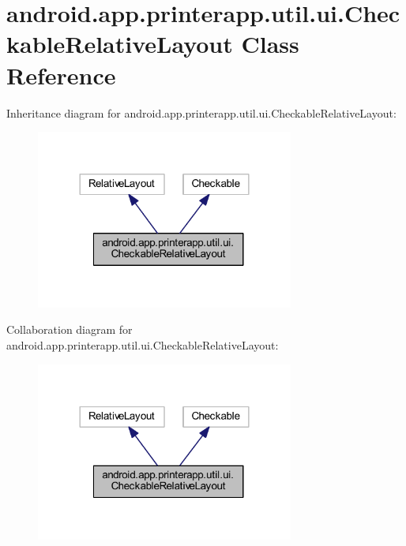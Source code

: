 \hypertarget{classandroid_1_1app_1_1printerapp_1_1util_1_1ui_1_1_checkable_relative_layout}{}\section{android.\+app.\+printerapp.\+util.\+ui.\+Checkable\+Relative\+Layout Class Reference}
\label{classandroid_1_1app_1_1printerapp_1_1util_1_1ui_1_1_checkable_relative_layout}


Inheritance diagram for android.\+app.\+printerapp.\+util.\+ui.\+Checkable\+Relative\+Layout\+:
\nopagebreak
\begin{figure}[H]
\begin{center}
\leavevmode
\includegraphics[width=240pt]{classandroid_1_1app_1_1printerapp_1_1util_1_1ui_1_1_checkable_relative_layout__inherit__graph}
\end{center}
\end{figure}


Collaboration diagram for android.\+app.\+printerapp.\+util.\+ui.\+Checkable\+Relative\+Layout\+:
\nopagebreak
\begin{figure}[H]
\begin{center}
\leavevmode
\includegraphics[width=240pt]{classandroid_1_1app_1_1printerapp_1_1util_1_1ui_1_1_checkable_relative_layout__coll__graph}
\end{center}
\end{figure}
